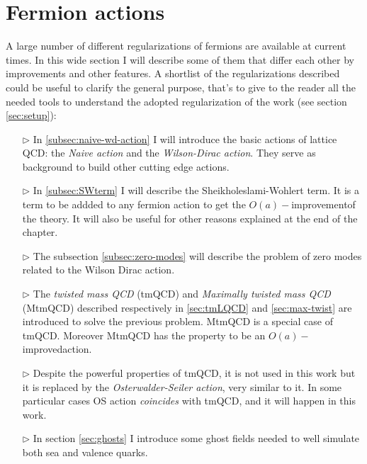 \documentclass[english, LaM, oneside, noexaminfo]{sapthesis}
\newcommand{\oaid}{$O(a)-$improved}
\newcommand{\oait}{$O(a)-$improvement}
\begin{document}
\section{Fermion actions}\label{sec:fermion-discretization}
\noindent
A large number of different regularizations of fermions are available at current times.
In this wide section I will describe some of them that differ each other by improvements and other features.
A shortlist of the regularizations described could be useful to clarify the general purpose, that's to give to the reader all the needed tools to understand the adopted regularization of the work (see section \ref{sec:setup}):
\begin{itemize}
    \item [$\triangleright$] In \ref{subsec:naive-wd-action} I will introduce the basic actions of lattice QCD: the \textit{Naive action} and the \textit{Wilson-Dirac action}.
        They serve as background to build other cutting edge actions.
    \item [$\triangleright$] In \ref{subsec:SWterm} I will describe the Sheikholeslami-Wohlert term.
        It is a term to be addded to any fermion action to get the \oait\space of the theory.
        It will also be useful for other reasons explained at the end of the chapter.
    \item [$\triangleright$] The subsection \ref{subsec:zero-modes} will describe the problem of zero modes related to the Wilson Dirac action.
    \item [$\triangleright$] The \textit{twisted mass QCD} (tmQCD) and \textit{Maximally twisted mass QCD} (MtmQCD) described respectively in \ref{sec:tmLQCD} and \ref{sec:max-twist} are introduced to solve the previous problem.
        MtmQCD is a special case of tmQCD. Moreover MtmQCD has the property to be an \oaid\space action.
    \item [$\triangleright$] Despite the powerful properties of tmQCD, it is not used in this work but it is replaced by the \textit{Osterwalder-Seiler action}, very similar to it.
        In some particular cases OS action \textit{coincides} with tmQCD, and it will happen in this work.
    \item [$\triangleright$] In section \ref{sec:ghosts} I introduce some ghost fields needed to well simulate both sea and valence quarks.
\end{itemize}
\end{document}
